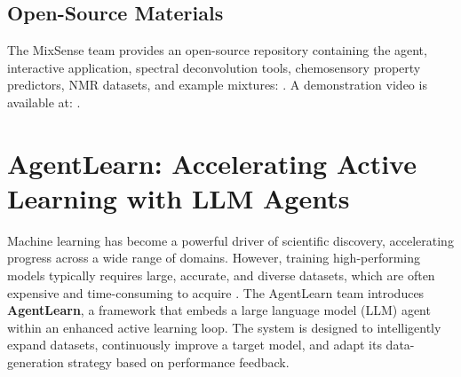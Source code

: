 \subsection*{Open-Source Materials}

The MixSense team provides an open-source repository containing the agent, interactive application, spectral deconvolution tools, chemosensory property predictors, NMR datasets, and example mixtures:  
.  
A demonstration video is available at: .








\section{AgentLearn: Accelerating Active Learning with LLM Agents}

Machine learning has become a powerful driver of scientific discovery, accelerating progress across a wide range of domains. However, training high-performing models typically requires large, accurate, and diverse datasets, which are often expensive and time-consuming to acquire \cite{8862913}. The AgentLearn team introduces \textbf{AgentLearn}, a framework that embeds a large language model (LLM) agent within an enhanced active learning loop. The system is designed to intelligently expand datasets, continuously improve a target model, and adapt its data-generation strategy based on performance feedback.

